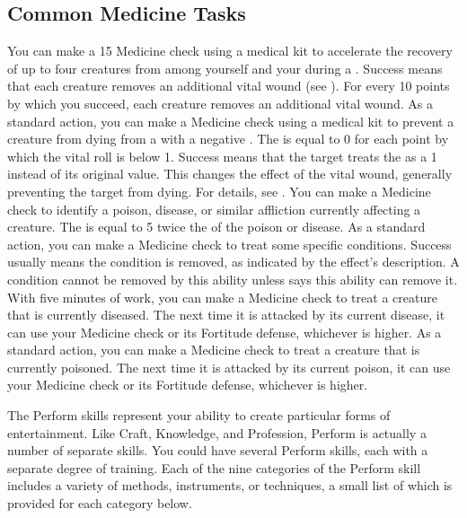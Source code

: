     \subsection{Common Medicine Tasks}
        \label{Accelerate Recovery}
            You can make a  15 Medicine check using a medical kit to accelerate the recovery of up to four creatures from among yourself and your  during a .
            Success means that each creature removes an additional vital wound (see ).
            For every 10 points by which you succeed, each creature removes an additional vital wound.
        \label{First Aid}
            As a standard action, you can make a Medicine check using a medical kit to prevent a creature from dying from a  with a negative .
            The  is equal to 0  for each point by which the vital roll is below 1.
            Success means that the target treats the  as a 1 instead of its original value.
            This changes the effect of the vital wound, generally preventing the target from dying.
            For details, see .
        \label{Identify Affliction}
            You can make a Medicine check to identify a poison, disease, or similar affliction currently affecting a creature.
            The  is equal to 5 \add twice the  of the poison or disease.
        \label{Treat Condition}
            As a standard action, you can make a Medicine check to treat some specific conditions.
            Success usually means the condition is removed, as indicated by the effect's description.
            A condition cannot be removed by this ability unless says this ability can remove it.
         With five minutes of work, you can make a Medicine check to treat a creature that is currently diseased.
            The next time it is attacked by its current disease, it can use your Medicine check or its Fortitude defense, whichever is higher.
         As a standard action, you can make a Medicine check to treat a creature that is currently poisoned.
            The next time it is attacked by its current poison, it can use your Medicine check or its Fortitude defense, whichever is higher.

\newpage
{}
    The Perform skills represent your ability to create particular forms of entertainment.
        Like Craft, Knowledge, and Profession, Perform is actually a number of separate skills.
        You could have several Perform skills, each with a separate degree of training.
        Each of the nine categories of the Perform skill includes a variety of methods, instruments, or techniques, a small list of which is provided for each category below.

